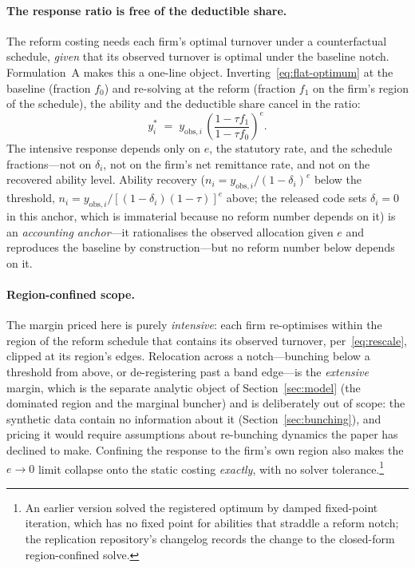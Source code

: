 \paragraph{The response ratio is free of the deductible share.} The reform
costing needs each firm's optimal turnover under a counterfactual schedule,
\emph{given} that its observed turnover is optimal under the baseline notch.
Formulation~A makes this a one-line object. Inverting~\eqref{eq:flat-optimum}
at the baseline (fraction $f_0$) and re-solving at the reform (fraction $f_1$
on the firm's region of the schedule), the ability and the deductible share
cancel in the ratio:
\begin{equation}
  y^{*}_i \;=\; y_{\mathrm{obs},i}\,
  \left(\frac{1-\tau f_1}{1-\tau f_0}\right)^{e}.
  \label{eq:rescale}
\end{equation}
The intensive response depends only on $e$, the statutory rate, and the
schedule fractions---not on $\delta_i$, not on the firm's net remittance rate,
and not on the recovered ability level. Ability recovery
($n_i=y_{\mathrm{obs},i}/(1-\delta_i)^{e}$ below the threshold,
$n_i=y_{\mathrm{obs},i}/[(1-\delta_i)(1-\tau)]^{e}$ above; the released code
sets $\delta_i=0$ in this anchor, which is immaterial because no reform number
depends on it) is an
\emph{accounting anchor}---it rationalises the observed allocation given
$e$ and reproduces the baseline by construction---but no reform number below
depends on it.

\paragraph{Region-confined scope.} The margin priced here is purely
\emph{intensive}: each firm re-optimises within the region of the reform
schedule that contains its observed turnover, per~\eqref{eq:rescale}, clipped
at its region's edges. Relocation across a notch---bunching below a threshold
from above, or de-registering past a band edge---is the \emph{extensive}
margin, which is the separate analytic object of Section~\ref{sec:model}
(the dominated region and the marginal buncher) and is deliberately out of
scope: the synthetic data contain no information about it
(Section~\ref{sec:bunching}), and pricing it would require assumptions about
re-bunching dynamics the paper has declined to make. Confining the response to
the firm's own region also makes the $e\to0$ limit collapse onto the static
costing \emph{exactly}, with no solver tolerance.\footnote{An earlier
version solved the registered optimum by damped fixed-point iteration, which
has no fixed point for abilities that straddle a reform notch; the
replication repository's changelog records the change to the closed-form
region-confined solve.}

